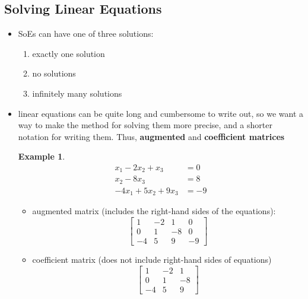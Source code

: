 \documentclass[a4paper,12pt]{article}
\theoremstyle{definition}
\theoremstyle{definition}
\newtheorem{example}{Example}[subsection]
\begin{document}
	\subsection{Solving Linear Equations}
	\begin{itemize}
		\item SoEs can have one of three solutions:
		\begin{enumerate}
			\item exactly one solution
			\item no solutions
			\item infinitely many solutions
		\end{enumerate}
		\item linear equations can be quite long and cumbersome to write out, so we want a way to make the method for solving them more precise, and a shorter notation for writing them. Thus, \textbf{augmented} and \textbf{coefficient matrices}
		
		\begin{example}
			\begin{align*}
				x_1 - 2x_2 + x_3 &= 0\\
				x_2 - 8x_3 &= 8\\
				-4x_1 + 5x_2 + 9x_3 &= -9
			\end{align*}
			\begin{itemize}
				\item augmented matrix (includes the right-hand sides of the equations):
				\begin{equation*}
					\begin{bmatrix}
						1 & -2 & 1 & 0\\
						0 & 1 & -8 & 0\\
						-4 & 5 & 9 & -9
					\end{bmatrix}
				\end{equation*}
				\item coefficient matrix (does not include right-hand sides of equations)
				\begin{equation*}
					\begin{bmatrix}
						1 & -2 & 1\\
						0 & 1 & -8\\
						-4 & 5 & 9
					\end{bmatrix}
				\end{equation*}
			\end{itemize}
		\end{example}
		
	\end{itemize}
\end{document}
